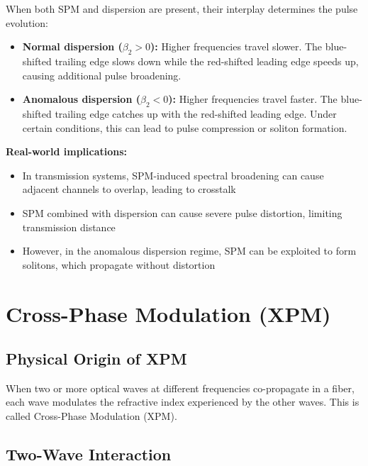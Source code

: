 \documentclass[a4paper, 11pt]{article}
\begin{document}
When both SPM and dispersion are present, their interplay determines the pulse evolution:

\begin{itemize}[leftmargin=*]
    \item \textbf{Normal dispersion ($\beta_2 > 0$):} Higher frequencies travel slower. The blue-shifted trailing edge slows down while the red-shifted leading edge speeds up, causing additional pulse broadening.
    
    \item \textbf{Anomalous dispersion ($\beta_2 < 0$):} Higher frequencies travel faster. The blue-shifted trailing edge catches up with the red-shifted leading edge. Under certain conditions, this can lead to pulse compression or soliton formation.
\end{itemize}

\begin{physical}
\textbf{Real-world implications:}
\begin{itemize}
    \item In transmission systems, SPM-induced spectral broadening can cause adjacent channels to overlap, leading to crosstalk
    \item SPM combined with dispersion can cause severe pulse distortion, limiting transmission distance
    \item However, in the anomalous dispersion regime, SPM can be exploited to form solitons, which propagate without distortion
\end{itemize}
\end{physical}

\section{Cross-Phase Modulation (XPM)}

\subsection{Physical Origin of XPM}

When two or more optical waves at different frequencies co-propagate in a fiber, each wave modulates the refractive index experienced by the other waves. This is called Cross-Phase Modulation (XPM).

\subsection{Two-Wave Interaction}
\end{document}
